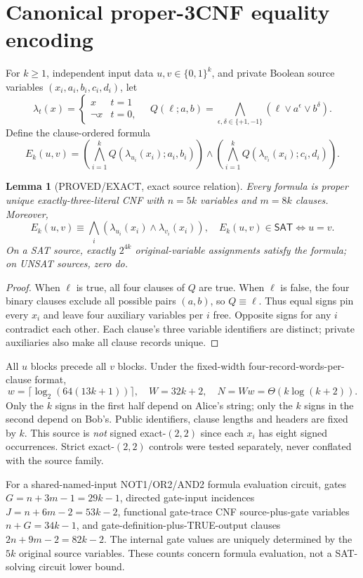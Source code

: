 \documentclass[11pt]{article}
\newtheorem{lemma}{Lemma}
\begin{document}
\section{Canonical proper-3CNF equality encoding}
For $k\ge1$, independent input data $u,v\in\{0,1\}^k$, and private Boolean source variables $(x_i,a_i,b_i,c_i,d_i)$, let
\[
\lambda_t(x)=\begin{cases}x&t=1\\ \neg x&t=0,\end{cases}
\quad
Q(\ell;a,b)=\bigwedge_{\epsilon,\delta\in\{+1,-1\}}(\ell\vee a^\epsilon\vee b^\delta).
\]
Define the clause-ordered formula
\[
E_k(u,v)=\left(\bigwedge_{i=1}^k Q(\lambda_{u_i}(x_i);a_i,b_i)\right)
\wedge
\left(\bigwedge_{i=1}^k Q(\lambda_{v_i}(x_i);c_i,d_i)\right).
\tag{1}
\]
\begin{lemma}[PROVED/EXACT, exact source relation]
Every formula is proper unique exactly-three-literal CNF with $n=5k$ variables and $m=8k$ clauses. Moreover,
\[
E_k(u,v)\equiv\bigwedge_i(\lambda_{u_i}(x_i)\wedge\lambda_{v_i}(x_i)),
\quad
E_k(u,v)\in\mathsf{SAT}\iff u=v.
\tag{2}
\]
On a SAT source, exactly $2^{4k}$ original-variable assignments satisfy the formula; on UNSAT sources, zero do.
\end{lemma}
\begin{proof}
When $\ell$ is true, all four clauses of $Q$ are true. When $\ell$ is false, the four binary clauses exclude all possible pairs $(a,b)$, so $Q\equiv\ell$. Thus equal signs pin every $x_i$ and leave four auxiliary variables per $i$ free. Opposite signs for any $i$ contradict each other. Each clause's three variable identifiers are distinct; private auxiliaries also make all clause records unique.
\end{proof}
All $u$ blocks precede all $v$ blocks. Under the fixed-width four-record-words-per-clause format,
\[
w=\lceil\log_2(64(13k+1))\rceil,\quad W=32k+2,\quad
N=Ww=\Theta(k\log(k+2)).
\tag{3}
\]
Only the $k$ signs in the first half depend on Alice's string; only the $k$ signs in the second depend on Bob's. Public identifiers, clause lengths and headers are fixed by $k$. This source is \emph{not} signed exact-$(2,2)$ since each $x_i$ has eight signed occurrences. Strict exact-$(2,2)$ controls were tested separately, never conflated with the source family.

For a shared-named-input NOT1/OR2/AND2 formula evaluation circuit, gates $G=n+3m-1=29k-1$, directed gate-input incidences $J=n+6m-2=53k-2$, functional gate-trace CNF source-plus-gate variables $n+G=34k-1$, and gate-definition-plus-TRUE-output clauses $2n+9m-2=82k-2$. The internal gate values are uniquely determined by the $5k$ original source variables. These counts concern formula evaluation, not a SAT-solving circuit lower bound.
\end{document}

